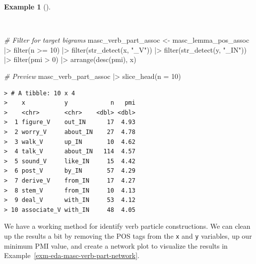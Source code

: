 \documentclass[
  letterpaper,
  DIV=11,
  numbers=noendperiod]{scrreprt}
\newenvironment{Shaded}{\begin{snugshade}}{\end{snugshade}}
\newcommand{\AttributeTok}[1]{\textcolor[rgb]{0.00,0.00,0.00}{#1}}
\newcommand{\CommentTok}[1]{\textcolor[rgb]{0.00,0.00,0.00}{\textit{#1}}}
\newcommand{\DecValTok}[1]{\textcolor[rgb]{0.00,0.00,0.00}{#1}}
\newcommand{\FunctionTok}[1]{\textcolor[rgb]{0.00,0.00,0.00}{#1}}
\newcommand{\NormalTok}[1]{\textcolor[rgb]{0.00,0.00,0.00}{#1}}
\newcommand{\OtherTok}[1]{\textcolor[rgb]{0.00,0.00,0.00}{#1}}
\newcommand{\SpecialCharTok}[1]{\textcolor[rgb]{0.00,0.00,0.00}{#1}}
\newcommand{\StringTok}[1]{\textcolor[rgb]{0.00,0.00,0.00}{#1}}
\theoremstyle{definition}
\newtheorem{example}{Example}[chapter]
\theoremstyle{remark}
\begin{document}
\begin{example}[]\protect\hypertarget{exm-eda-masc-bigrams-pmi-filtered}{}\label{exm-eda-masc-bigrams-pmi-filtered}

~

\begin{Shaded}
\begin{Highlighting}[]
\CommentTok{\# Filter for target bigrams}
\NormalTok{masc\_verb\_part\_assoc }\OtherTok{\textless{}{-}}
\NormalTok{  masc\_lemma\_pos\_assoc }\SpecialCharTok{|\textgreater{}}
  \FunctionTok{filter}\NormalTok{(n }\SpecialCharTok{\textgreater{}=} \DecValTok{10}\NormalTok{) }\SpecialCharTok{|\textgreater{}}
  \FunctionTok{filter}\NormalTok{(}\FunctionTok{str\_detect}\NormalTok{(x, }\StringTok{"\_V"}\NormalTok{)) }\SpecialCharTok{|\textgreater{}}
  \FunctionTok{filter}\NormalTok{(}\FunctionTok{str\_detect}\NormalTok{(y, }\StringTok{"\_IN"}\NormalTok{)) }\SpecialCharTok{|\textgreater{}}
  \FunctionTok{filter}\NormalTok{(pmi }\SpecialCharTok{\textgreater{}} \DecValTok{0}\NormalTok{) }\SpecialCharTok{|\textgreater{}}
  \FunctionTok{arrange}\NormalTok{(}\FunctionTok{desc}\NormalTok{(pmi), x)}

\CommentTok{\# Preview}
\NormalTok{masc\_verb\_part\_assoc }\SpecialCharTok{|\textgreater{}}
  \FunctionTok{slice\_head}\NormalTok{(}\AttributeTok{n =} \DecValTok{10}\NormalTok{)}
\end{Highlighting}
\end{Shaded}

\begin{verbatim}
> # A tibble: 10 x 4
>    x           y            n   pmi
>    <chr>       <chr>    <dbl> <dbl>
>  1 figure_V    out_IN      17  4.93
>  2 worry_V     about_IN    27  4.78
>  3 walk_V      up_IN       10  4.62
>  4 talk_V      about_IN   114  4.57
>  5 sound_V     like_IN     15  4.42
>  6 post_V      by_IN       57  4.29
>  7 derive_V    from_IN     17  4.27
>  8 stem_V      from_IN     10  4.13
>  9 deal_V      with_IN     53  4.12
> 10 associate_V with_IN     48  4.05
\end{verbatim}

\end{example}

We have a working method for identify verb particle constructions. We
can clean up the results a bit by removing the POS tags from the
\texttt{x} and \texttt{y} variables, up our minimum PMI value, and
create a network plot to visualize the results in
Example~\ref{exm-eda-masc-verb-part-network}.
\end{document}
